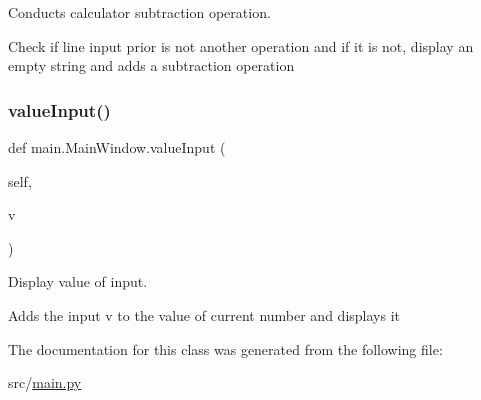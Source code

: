 Conducts calculator subtraction operation. 

Check if line input prior is not another operation and if it is not, display an empty string and adds a subtraction operation \mbox{\label{classmain_1_1_main_window_a8d41e3c99603b99d23073aeea7d01534}} 
\subsubsection{\texorpdfstring{value\+Input()}{valueInput()}}
{\footnotesize\ttfamily def main.\+Main\+Window.\+value\+Input (\begin{DoxyParamCaption}\item[{}]{self,  }\item[{}]{v }\end{DoxyParamCaption})}



Display value of input. 

Adds the input v to the value of current number and displays it 

The documentation for this class was generated from the following file\+:\begin{DoxyCompactItemize}
\item 
src/\hyperlink{main_8py}{main.\+py}\end{DoxyCompactItemize}
